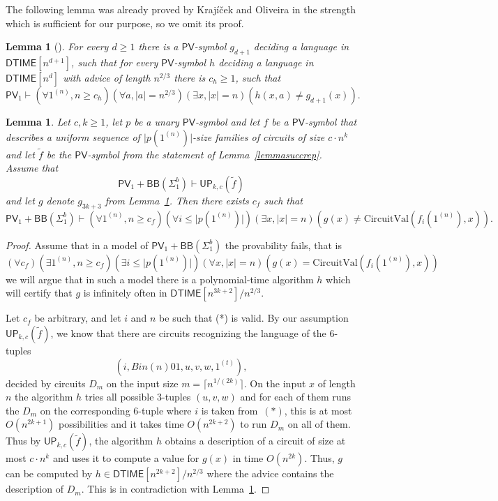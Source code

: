 \documentclass[11pt]{article}
\newcommand{\PV}{\mathsf{PV}}
\newcommand{\UP}{\mathsf{UP}}
\newcommand{\DTIME}{\mathsf{DTIME}}
\newcommand{\CircuitVal}{\text{CircuitVal}}
\newcommand{\abs}[1]{\lvert #1 \rvert}
\newcommand{\ceil}[1]{\lceil #1 \rceil}
\newtheorem{lemma}[theorem]{Lemma}
\theoremstyle{definition}
\theoremstyle{definition}
\theoremstyle{remark}
\begin{document}
The following lemma was already proved by Krajíček and Oliveira in the strength which is sufficient for our purpose, so we omit its proof.

\begin{lemma}[{{\cite[Lemma~3.1]{KO17}}}]\label{lemmatimehierarchy}
    For every $d\geq 1$ there is a $\PV$-symbol $g_{d+1}$ deciding a language in $\DTIME[n^{d+1}]$, such that for every $\PV$-symbol $h$ deciding a language in $\DTIME[n^d]$ with advice of length $n^{2/3}$ there is $c_h\geq 1$, such that 
    \[\PV_1\vdash (\forall 1^{(n)},n\geq c_h)(\forall a,\abs{a}=n^{2/3})(\exists x,\abs{x}=n)(h(x,a)\neq g_{d+1}(x)).\]
\end{lemma}

\begin{lemma}
    Let $c,k\geq 1$, let $p$ be a unary $\PV$-symbol and let $f$ be a $\PV$-symbol that describes a uniform sequence of $\abs{p(1^{(n)})}$-size families of circuits of size $c\cdot n^k$ and let $\tilde f$ be the $\PV$-symbol from the statement of Lemma~\ref{lemmasuccrep}. Assume that \[\PV_1+\mathsf{BB}(\Sigma^b_1)\vdash \UP_{k,c}(\tilde f)\] and let $g$ denote $g_{3k+3}$ from Lemma~\ref{lemmatimehierarchy}. Then there exists $c_f$ such that 
    \[\PV_1+\mathsf{BB}(\Sigma^b_1)\vdash (\forall 1^{(n)},n\geq c_f)(\forall i\leq \abs{p(1^{(n)})})(\exists x,\abs{x}=n)(g(x)\neq \CircuitVal(f_i(1^{(n)}),x)).\]
\end{lemma}
\begin{proof}
    Assume that in a model of $\PV_1+\mathsf{BB}(\Sigma^b_1)$ the provability fails, that is 
    \[(\forall c_f)(\exists 1^{(n)},n\geq c_f)(\exists i\leq \abs{p(1^{(n)})})(\forall x,\abs{x}=n)(g(x) =\CircuitVal(f_i(1^{(n)}),x))\tag{*}\]
    we will argue that in such a model there is a polynomial-time algorithm $h$ which will certify that $g$ is infinitely often in $\DTIME[n^{3k+2}]/n^{2/3}$.

    Let $c_f$ be arbitrary, and let $i$ and $n$ be such that (*) is valid. By our assumption $\UP_{k,c}(\tilde f)$, we know that there are circuits recognizing the language of the $6$-tuples
    \[(i,Bin(n)01,u,v,w,1^{(t)}),\]
    decided by circuits $D_m$ on the input size $m=\ceil{n^{1/(2k)}}$. On the input $x$ of length $n$ the algorithm $h$ tries all possible $3$-tuples $(u,v,w)$ and for each of them runs the $D_m$ on the corresponding $6$-tuple where $i$ is taken from~$(*)$, this is at most $O(n^{2k+1})$ possibilities and it takes time $O(n^{2k+2})$ to run $D_m$ on all of them. Thus by $\UP_{k,c}(\tilde f)$, the algorithm $h$ obtains a description of a circuit of size at most $c\cdot n^k$ and uses it to compute a value for $g(x)$ in time $O(n^{2k})$. Thus, $g$ can be computed by $h\in \DTIME[n^{2k+2}]/n^{2/3}$ where the advice contains the description of $D_m$. This is in contradiction with Lemma~\ref{lemmatimehierarchy}.
\end{proof}
\end{document}
